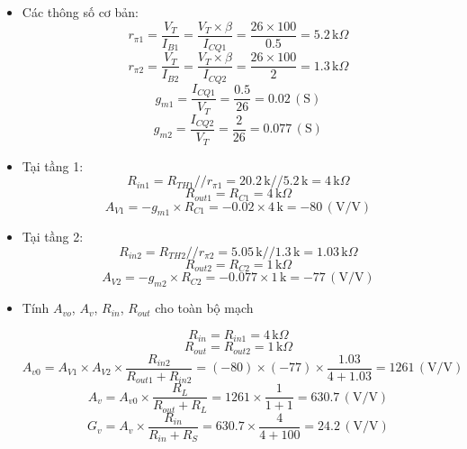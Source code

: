 \begin{itemize}[label=-]
	\item Các thông số cơ bản:
	\[
	r_{\pi 1} = \frac{V_T}{I_{B1}} = \frac{V_T \times \beta}{I_{CQ1}}
	= \frac{26 \times 100}{0.5} = 5.2\,\text{k}\Omega
	\]
	\[
	r_{\pi 2} = \frac{V_T}{I_{B2}} = \frac{V_T \times \beta}{I_{CQ2}}
	= \frac{26 \times 100}{2} = 1.3\,\text{k}\Omega
	\]
	\[
	g_{m1} = \frac{I_{CQ1}}{V_T} = \frac{0.5}{26} = 0.02\,(\text{S})
	\]
	\[
	g_{m2} = \frac{I_{CQ2}}{V_T} = \frac{2}{26} = 0.077\,(\text{S})
	\]
	
	\item Tại tầng 1:
	\[
	R_{in1} = R_{TH1} // r_{\pi1}
	= 20.2\,\text{k} // 5.2\,\text{k}
	= 4\,\text{k}\Omega
	\]
	\[
	R_{out1} = R_{C1} = 4\,\text{k}\Omega
	\]
	\[
	A_{V1} = -g_{m1} \times R_{C1}
	= -0.02 \times 4\,\text{k}
	= -80\,(\text{V/V})
	\]
	
	\item Tại tầng 2:
	\[
	R_{in2} = R_{TH2} // r_{\pi2}
	= 5.05\,\text{k} // 1.3\,\text{k}
	= 1.03\,\text{k}\Omega
	\]
	\[
	R_{out2} = R_{C2} = 1\,\text{k}\Omega
	\]
	\[
	A_{V2} = -g_{m2} \times R_{C2}
	= -0.077 \times 1\,\text{k}
	= -77\,(\text{V/V})
	\]
	
	\item Tính $ A_{vo}$, $A_{v}$, $R_{in}$, $R_{out}$ cho toàn bộ mạch
	
	\[
	R_{in} = R_{in1} = 4\,\text{k}\Omega
	\]
	\[
	R_{out} = R_{out2} = 1\,\text{k}\Omega
	\]
	\[
	A_{v0} = A_{V1} \times A_{V2} \times
	\frac{R_{in2}}{R_{out1} + R_{in2}}
	= (-80) \times (-77) \times
	\frac{1.03}{4 + 1.03}
	= 1261\,(\text{V/V})
	\]
	\[
	A_v = A_{v0} \times
	\frac{R_L}{R_{out} + R_L}
	= 1261 \times
	\frac{1}{1 + 1}
	= 630.7\,(\text{V/V})
	\]
	\[
	G_v = A_v \times
	\frac{R_{in}}{R_{in} + R_S}
	= 630.7 \times
	\frac{4}{4 + 100}
	= 24.2\,(\text{V/V})
	\]
	

\end{itemize}
